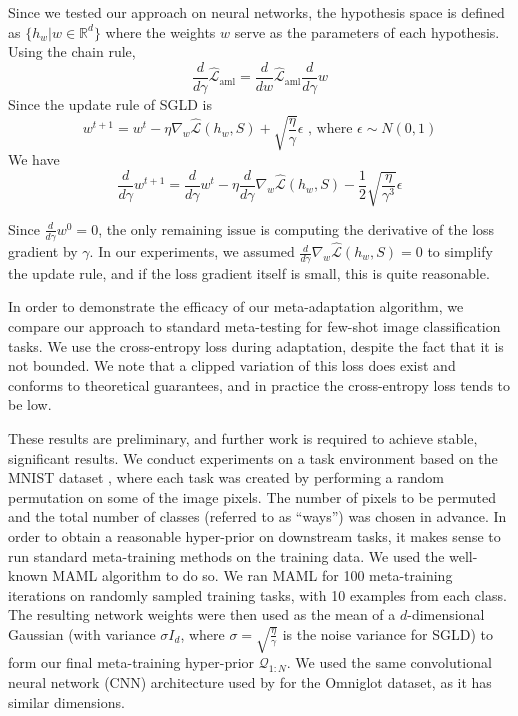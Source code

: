 \documentclass{article}
\theoremstyle{definition}
\begin{document}
Since we tested our approach on neural networks, the hypothesis space is defined as $\{h_w|w\in \mathbb{R}^d\}$ where the weights $w$ serve as the parameters of each hypothesis.
Using the chain rule, 
$$\frac{d}{d\gamma}\hat{\mathcal{L}}_{\mathrm{aml}}=\frac{d}{dw}\hat{\mathcal{L}}_{\mathrm{aml}}\frac{d}{d\gamma}w$$
Since the update rule of SGLD is 
$$w^{t+1}=w^t-\eta\nabla_w \hat{\mathcal{L}}(h_w,S)+\sqrt{\frac{\eta}{\gamma}}\epsilon \text{ , where } \epsilon\sim N(0,1)$$
We have
\begin{equation}
\frac{d}{d\gamma}w^{t+1}=\frac{d}{d\gamma}w^t-\eta\frac{d}{d\gamma}\nabla_w \hat{\mathcal{L}}(h_w,S)-\frac{1}{2}\sqrt{\frac{\eta}{\gamma^3}}\epsilon
\end{equation}

Since $\frac{d}{d\gamma}w^0=0$, the only remaining issue is computing the derivative of the loss gradient by $\gamma$. In our experiments, we assumed $\frac{d}{d\gamma}\nabla_w \hat{\mathcal{L}}(h_w,S)=0$ to simplify the update rule, and if the loss gradient itself is small, this is quite reasonable.

In order to demonstrate the efficacy of our meta-adaptation algorithm, we compare our approach to standard meta-testing for few-shot image classification tasks. 
We use the cross-entropy loss during adaptation, despite the fact that it is not bounded. We note that a clipped variation of this loss does exist and conforms to theoretical guarantees, and in practice the cross-entropy loss tends to be low.

These results are preliminary, and further work is required to achieve stable, significant results. We conduct experiments on a task environment based on the MNIST dataset \citep{LeCun1998}, where each task was created by performing a random permutation on some of the image pixels. The number of pixels to be permuted and the total number of classes (referred to as ``ways'') was chosen in advance. In order to obtain a reasonable hyper-prior on downstream tasks, it makes sense to run standard meta-training methods on the training data.
We used the well-known MAML \citep{Finn2017}  algorithm to do so. We ran MAML for 100 meta-training iterations on randomly sampled training tasks, with 10 examples from each class. The resulting network weights were then used as the mean of a $d$-dimensional Gaussian (with variance $\sigma I_d$, where $\sigma=\sqrt{\frac{\eta}{\gamma}}$ is the noise variance for SGLD) to form our final meta-training hyper-prior $\mathcal{Q}_{1:N}$. We used the same convolutional neural network (CNN) architecture used by \citet{Vinyals2016} for the Omniglot dataset, as it has similar dimensions. 
\end{document}
